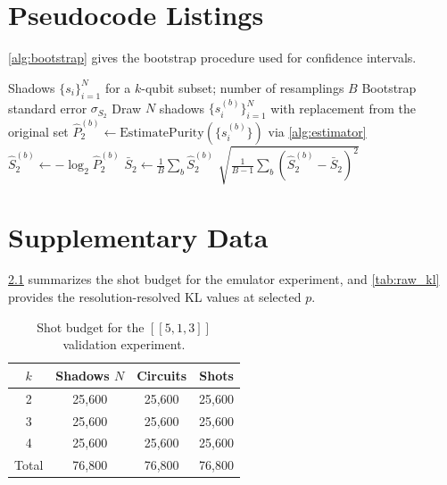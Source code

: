 \documentclass[12pt,a4paper,oneside]{book}
\theoremstyle{plain}
\theoremstyle{definition}
\theoremstyle{remark}
\begin{document}
\chapter{Pseudocode Listings}
\label{app:pseudocode}

\cref{alg:bootstrap} gives the bootstrap procedure used for confidence intervals.

\begin{algorithm}[H]
\caption{Bootstrap standard error for $\widehat{S}_2$}\label{alg:bootstrap}
\begin{algorithmic}[1]
\Require Shadows $\{s_i\}_{i=1}^{N}$ for a $k$-qubit subset; number of resamplings $B$
\Ensure Bootstrap standard error $\sigma_{S_2}$
    \State Draw $N$ shadows $\{s^{(b)}_i\}_{i=1}^{N}$ with replacement from the original set
    \State $\widehat{P}_2^{(b)} \gets \mathrm{EstimatePurity}(\{s^{(b)}_i\})$ via \cref{alg:estimator}
    \State $\widehat{S}_2^{(b)} \gets -\log_2 \widehat{P}_2^{(b)}$
\EndFor
\State $\bar{S}_2 \gets \frac{1}{B} \sum_b \widehat{S}_2^{(b)}$
\State \Return $\sqrt{\frac{1}{B-1} \sum_b (\widehat{S}_2^{(b)} - \bar{S}_2)^2}$
\end{algorithmic}
\end{algorithm}

\chapter{Supplementary Data}
\label{app:data}

\cref{tab:shot_budget} summarizes the shot budget for the emulator experiment, and \cref{tab:raw_kl} provides the resolution-resolved KL values at selected $p$.

\begin{table}[H]
\centering
\caption{Shot budget for the $[[5,1,3]]$ validation experiment.}
\label{tab:shot_budget}
\begin{tabular}{c|c|c|c}
\toprule
$k$ & Shadows $N$ & Circuits & Shots \\
\midrule
2 & 25{,}600 & 25{,}600 & 25{,}600 \\
3 & 25{,}600 & 25{,}600 & 25{,}600 \\
4 & 25{,}600 & 25{,}600 & 25{,}600 \\
\midrule
Total & 76{,}800 & 76{,}800 & 76{,}800 \\
\bottomrule
\end{tabular}
\end{table}
\end{document}
